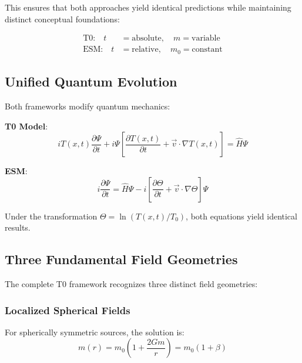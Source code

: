\documentclass[twocolumn,aps,prl]{revtex4-2}
\newcommand{\Tfieldt}{T(x,t)}
\newcommand{\Tzero}{T_0}
\begin{document}
	This ensures that both approaches yield identical predictions while maintaining distinct conceptual foundations:
	
	\begin{align}
		\text{T0:} \quad t &= \text{absolute}, \quad m = \text{variable} \\
		\text{ESM:} \quad t &= \text{relative}, \quad m_0 = \text{constant}
		\label{eq:framework_comparison}
	\end{align}
	
	\subsection{Unified Quantum Evolution}
	\label{subsec:unified_quantum_evolution}
	
	Both frameworks modify quantum mechanics:
	
	\textbf{T0 Model}:
	\begin{equation}
		i \Tfieldt \frac{\partial\Psi}{\partial t} + i \Psi \left[\frac{\partial \Tfieldt}{\partial t} + \vec{v} \cdot \nabla \Tfieldt\right] = \hat{H} \Psi
		\label{eq:t0_schrodinger}
	\end{equation}
	
	\textbf{ESM}:
	\begin{equation}
		i\frac{\partial\Psi}{\partial t} = \hat{H}\Psi - i\left[\frac{\partial\Theta}{\partial t} + \vec{v} \cdot \nabla\Theta\right]\Psi
		\label{eq:esm_schrodinger}
	\end{equation}
	
	Under the transformation \(\Theta = \ln(\Tfieldt/\Tzero)\), both equations yield identical results.
	
	\subsection{Three Fundamental Field Geometries}
	\label{subsec:three_geometries}
	
	The complete T0 framework recognizes three distinct field geometries:
	
	\subsubsection{Localized Spherical Fields}
	\label{subsubsec:localized_spherical}
	
	For spherically symmetric sources, the solution is:
	\begin{equation}
		m(r) = m_0\left(1 + \frac{2Gm}{r}\right) = m_0(1 + \beta)
		\label{eq:spherical_solution}
	\end{equation}
	
\end{document}
